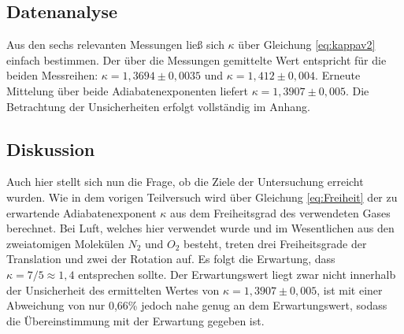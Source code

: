 	\subsection{Datenanalyse}
		
		Aus den sechs relevanten Messungen ließ sich $\kappa$ über Gleichung \ref{eq:kappav2} einfach bestimmen.
		Der über die Messungen gemittelte Wert entspricht für die beiden Messreihen: $\kappa = 1,3694\pm 0,0035$ und $\kappa = 1,412\pm 0,004$.
		Erneute Mittelung über beide Adiabatenexponenten liefert $\kappa = 1,3907\pm 0,005$.
		Die Betrachtung der Unsicherheiten erfolgt vollständig im Anhang.
		
	\subsection{Diskussion}
		
		Auch hier stellt sich nun die Frage, ob die Ziele der Untersuchung erreicht wurden.
		Wie in dem vorigen Teilversuch wird über Gleichung \ref{eq:Freiheit} der zu erwartende Adiabatenexponent $\kappa$ aus dem Freiheitsgrad des verwendeten Gases berechnet.
		Bei Luft, welches hier verwendet wurde und im Wesentlichen aus den zweiatomigen Molekülen $N_2$ und $O_2$ besteht, treten drei Freiheitsgrade der Translation und zwei der Rotation auf.
		Es folgt die Erwartung, dass $\kappa = 7/5 \approx 1,4$ entsprechen sollte.
		Der Erwartungswert liegt zwar nicht innerhalb der Unsicherheit des ermittelten Wertes von $\kappa = 1,3907\pm 0,005$, ist mit einer Abweichung von nur 0,66\% jedoch nahe genug an dem Erwartungswert, sodass die Übereinstimmung mit der Erwartung gegeben ist.
		